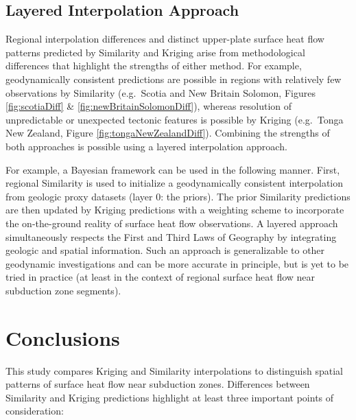\hypertarget{layered-interpolation-approach}{%
\subsection{Layered Interpolation Approach}\label{layered-interpolation-approach}}

Regional interpolation differences and distinct upper-plate surface heat flow patterns predicted by Similarity and Kriging arise from methodological differences that highlight the strengths of either method. For example, geodynamically consistent predictions are possible in regions with relatively few observations by Similarity (e.g.~Scotia and New Britain Solomon, Figures \ref{fig:scotiaDiff} \& \ref{fig:newBritainSolomonDiff}), whereas resolution of unpredictable or unexpected tectonic features is possible by Kriging (e.g.~Tonga New Zealand, Figure \ref{fig:tongaNewZealandDiff}). Combining the strengths of both approaches is possible using a layered interpolation approach.

For example, a Bayesian framework can be used in the following manner. First, regional Similarity is used to initialize a geodynamically consistent interpolation from geologic proxy datasets (layer 0: the priors). The prior Similarity predictions are then updated by Kriging predictions with a weighting scheme to incorporate the on-the-ground reality of surface heat flow observations. A layered approach simultaneously respects the First and Third Laws of Geography by integrating geologic and spatial information. Such an approach is generalizable to other geodynamic investigations and can be more accurate in principle, but is yet to be tried in practice (at least in the context of regional surface heat flow near subduction zone segments).

\hypertarget{conclusions-1}{%
\section{Conclusions}\label{conclusions-1}}

This study compares Kriging and Similarity interpolations to distinguish spatial patterns of surface heat flow near subduction zones. Differences between Similarity and Kriging predictions highlight at least three important points of consideration:

